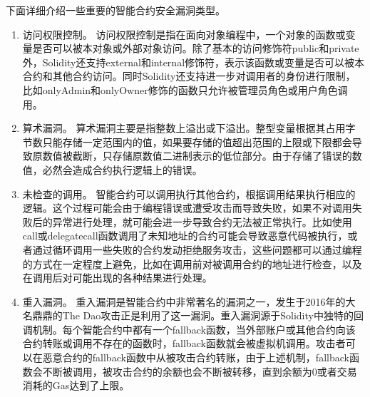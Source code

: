 下面详细介绍一些重要的智能合约安全漏洞类型。
\begin{enumerate}[label=(\arabic*)]
    \item 访问权限控制。
    访问权限控制是指在面向对象编程中，一个对象的函数或变量是否可以被本对象或外部对象访问。除了基本的访问修饰符public和private外，Solidity还支持external和internal修饰符，表示该函数或变量是否可以被本合约和其他合约访问。同时Solidity还支持进一步对调用者的身份进行限制，比如onlyAdmin和onlyOwner修饰的函数只允许被管理员角色或用户角色调用\cite{grishchenko2018semantic}。
    \item 算术漏洞。
    算术漏洞主要是指整数上溢出或下溢出。整型变量根据其占用字节数只能存储一定范围内的值，如果要存储的值超出范围的上限或下限都会导致原数值被截断，只存储原数值二进制表示的低位部分。由于存储了错误的数值，必然会造成合约执行逻辑上的错误。
    \item 未检查的调用。
    智能合约可以调用执行其他合约，根据调用结果执行相应的逻辑。这个过程可能会由于编程错误或遭受攻击而导致失败，如果不对调用失败后的异常进行处理，就可能会进一步导致合约无法被正常执行。比如使用call或delegatecall函数调用了未知地址的合约可能会导致恶意代码被执行，或者通过循环调用一些失败的合约发动拒绝服务攻击，这些问题都可以通过编程的方式在一定程度上避免，比如在调用前对被调用合约的地址进行检查，以及在调用后对可能出现的各种结果进行处理\cite{zhang2022zh}。
    \item 重入漏洞。
    重入漏洞是智能合约中非常著名的漏洞之一，发生于2016年的大名鼎鼎的The Dao攻击正是利用了这一漏洞。重入漏洞源于Solidity中独特的回调机制。每个智能合约中都有一个fallback函数，当外部账户或其他合约向该合约转账或调用不存在的函数时，fallback函数就会被虚拟机调用。攻击者可以在恶意合约的fallback函数中从被攻击合约转账，由于上述机制，fallback函数会不断被调用，被攻击合约的余额也会不断被转移，直到余额为0或者交易消耗的Gas达到了上限。
    
    
    

\end{enumerate}
